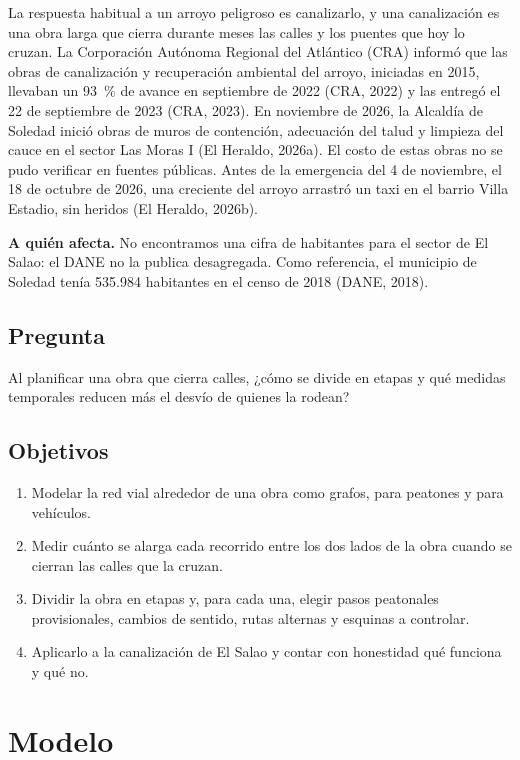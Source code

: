 \documentclass[12pt,letterpaper]{article}
\begin{document}
La respuesta habitual a un arroyo peligroso es canalizarlo, y una canalización es una obra larga que cierra durante meses las calles y los puentes que hoy lo cruzan. La Corporación Autónoma Regional del Atlántico (CRA) informó que las obras de canalización y recuperación ambiental del arroyo, iniciadas en 2015, llevaban un 93~\% de avance en septiembre de 2022 (CRA, 2022) y las entregó el 22 de septiembre de 2023 (CRA, 2023). En noviembre de 2026, la Alcaldía de Soledad inició obras de muros de contención, adecuación del talud y limpieza del cauce en el sector Las Moras I (El Heraldo, 2026a). El costo de estas obras no se pudo verificar en fuentes públicas. Antes de la emergencia del 4 de noviembre, el 18 de octubre de 2026, una creciente del arroyo arrastró un taxi en el barrio Villa Estadio, sin heridos (El Heraldo, 2026b).

\textbf{A quién afecta.} No encontramos una cifra de habitantes para el sector de El Salao: el DANE no la publica desagregada. Como referencia, el municipio de Soledad tenía 535.984 habitantes en el censo de 2018 (DANE, 2018).

\subsection{Pregunta}
Al planificar una obra que cierra calles, ¿cómo se divide en etapas y qué medidas temporales reducen más el desvío de quienes la rodean?

\subsection{Objetivos}
\begin{enumerate}
\item Modelar la red vial alrededor de una obra como grafos, para peatones y para vehículos.
\item Medir cuánto se alarga cada recorrido entre los dos lados de la obra cuando se cierran las calles que la cruzan.
\item Dividir la obra en etapas y, para cada una, elegir pasos peatonales provisionales, cambios de sentido, rutas alternas y esquinas a controlar.
\item Aplicarlo a la canalización de El Salao y contar con honestidad qué funciona y qué no.
\end{enumerate}

\section{Modelo}
\end{document}
